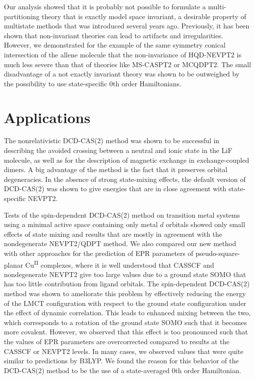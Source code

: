 Our analysis showed that it is probably not possible to formulate a multi-partitioning theory that is exactly model space invariant, a desirable property of multistate methods that was introduced several years ago.\cite{Grano_2011_214113} Previously, it has been shown that non-invariant theories can lead to artifacts and irregularities. However, we demonstrated for the example of the same symmetry conical intersection of the allene molecule that the non-invariance of HQD-NEVPT2 is much less severe than that of theories like MS-CASPT2 or MCQDPT2. The small disadvantage of a not exactly invariant theory was shown to be outweighed by the possibility to use state-specific 0th order Hamiltonians.
\clearpage
\section{Applications}
The nonrelativistic DCD-CAS(2) method was shown to be successful in describing the avoided crossing between a neutral and ionic state in the LiF molecule, as well as for the description of magnetic exchange in exchange-coupled dimers. A big advantage of the method is the fact that it preserves orbital degeneracies. In the absence of strong state-mixing effects, the default version of DCD-CAS(2) was shown to give energies that are in close agreement with state-specific NEVPT2.

Tests of the spin-dependent DCD-CAS(2) method on
transition metal systems using a minimal active space containing
only metal $d$ orbitals showed only small effects of state mixing
and results that are mostly in agreement with the nondegenerate
NEVPT2/QDPT method. We also compared our new method with
other approaches for the prediction of EPR parameters of pseudo-square-planar Cu\textsuperscript{II} complexes, where it is well understood that
CASSCF and nondegenerate NEVPT2 give too large values due to
a ground state SOMO that has too little contribution from ligand
orbitals. The spin-dependent DCD-CAS(2) method was shown to
ameliorate this problem by effectively reducing the energy of the
LMCT configuration with respect to the ground state configuration under the effect of dynamic correlation. This leads to enhanced
mixing between the two, which corresponds to a rotation of the
ground state SOMO such that it becomes more covalent. However, we observed that this effect is too pronounced such that the values
of EPR parameters are overcorrected compared to results at the
CASSCF or NEVPT2 levels. In many cases, we observed values that
were quite similar to predictions by B3LYP. We found the reason for
this behavior of the DCD-CAS(2) method to be the use of a state-averaged 0th order Hamiltonian.

